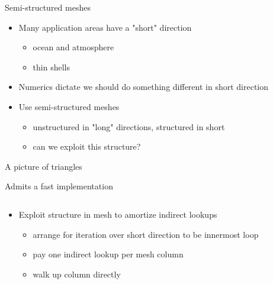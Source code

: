 \documentclass[bigger]{beamer}
\begin{document}
\begin{frame}[label={sec:orgheadline11}]{Semi-structured meshes}
\begin{itemize}
\item Many application areas have a "short" direction
\begin{itemize}
\item ocean and atmosphere
\item thin shells
\end{itemize}
\item Numerics dictate we should do something different in short
direction
\item Use semi-structured meshes
\begin{itemize}
\item unstructured in "long" directions, structured in short
\item can we exploit this structure?
\end{itemize}
\end{itemize}
\end{frame}

\begin{frame}[label={sec:orgheadline12}]{A picture of triangles}
\begin{center}

\end{center}
\end{frame}

\begin{frame}[label={sec:orgheadline13}]{Admits a fast implementation}
\begin{columns}
\begin{column}{0.6\columnwidth}
\begin{itemize}
\item Exploit structure in mesh to amortize indirect lookups
\begin{itemize}
\item arrange for iteration over short direction to be innermost loop
\item pay one indirect lookup per mesh column
\item walk up column directly
\end{itemize}
\end{itemize}
\end{column}

\begin{column}{0.5\columnwidth}
\hfill
\end{column}
\end{columns}
\end{frame}
\end{document}
